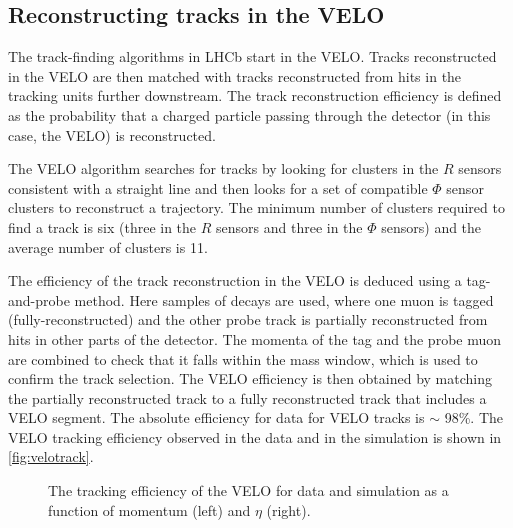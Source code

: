\subsection{Reconstructing tracks in the VELO}

The track-finding algorithms in LHCb start in the VELO. Tracks reconstructed in the VELO are then matched with tracks reconstructed from hits in the tracking units further downstream.
The track reconstruction efficiency is defined as the probability that a charged particle passing through the detector (in this case, the VELO) is reconstructed. %

The VELO algorithm searches for tracks by looking for clusters in the $R$ sensors consistent with a straight line and then looks for a set of compatible $\Phi$ sensor clusters to reconstruct a trajectory. The minimum number of clusters required to find a track is six (three in the $R$ sensors and three in the $\Phi$ sensors) and the average number of clusters is 11.

The efficiency of the track reconstruction in the VELO is deduced using a tag-and-probe method. Here samples of \jpsi\to\mup\mun decays are used, where one muon is tagged (fully-reconstructed) and the other probe track is partially reconstructed from hits in other parts of the detector. The momenta of the tag and the probe muon are combined to check that it falls within the \jpsi mass window, which is used to confirm the track selection. The VELO efficiency is then obtained by matching the partially reconstructed track to a fully reconstructed track that includes a VELO segment. The absolute efficiency for data for VELO tracks is $\sim$ 98\%. The VELO tracking efficiency observed in the data and in the simulation is shown in \autoref{fig:velotrack}.


\begin{figure}
  \centering
    \caption{The tracking efficiency of the VELO for data and simulation as a function of momentum (left) and $\eta$ (right).
  }%
  \label{fig:velotrack}
\end{figure}



